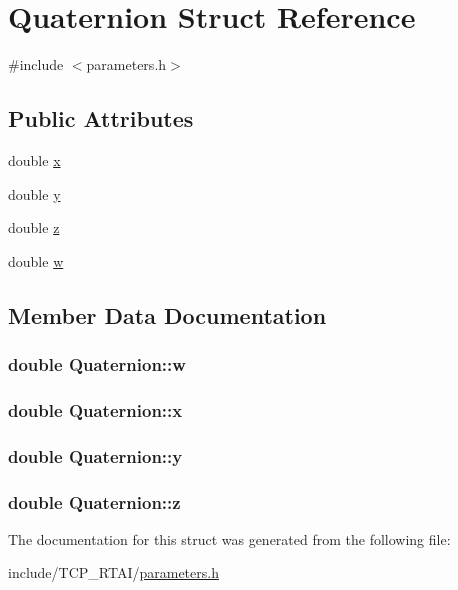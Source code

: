 \hypertarget{structQuaternion}{
\section{Quaternion Struct Reference}
\label{structQuaternion}
}


{\ttfamily \#include $<$parameters.h$>$}

\subsection*{Public Attributes}
\begin{DoxyCompactItemize}
\item 
double \hyperlink{structQuaternion_a65c93d8db6c57203447bd0594b608512}{x}
\item 
double \hyperlink{structQuaternion_acfea23e3ba2b57356fe36b4d8f4c52f3}{y}
\item 
double \hyperlink{structQuaternion_a90bbdb05526bddfbc3247dcc9a5cace4}{z}
\item 
double \hyperlink{structQuaternion_aeded08fcb4e8d0866e612ed81cb44aa7}{w}
\end{DoxyCompactItemize}


\subsection{Member Data Documentation}
\hypertarget{structQuaternion_aeded08fcb4e8d0866e612ed81cb44aa7}{
\subsubsection[{w}]{\setlength{\rightskip}{0pt plus 5cm}double {\bf Quaternion::w}}}
\label{structQuaternion_aeded08fcb4e8d0866e612ed81cb44aa7}
\hypertarget{structQuaternion_a65c93d8db6c57203447bd0594b608512}{
\subsubsection[{x}]{\setlength{\rightskip}{0pt plus 5cm}double {\bf Quaternion::x}}}
\label{structQuaternion_a65c93d8db6c57203447bd0594b608512}
\hypertarget{structQuaternion_acfea23e3ba2b57356fe36b4d8f4c52f3}{
\subsubsection[{y}]{\setlength{\rightskip}{0pt plus 5cm}double {\bf Quaternion::y}}}
\label{structQuaternion_acfea23e3ba2b57356fe36b4d8f4c52f3}
\hypertarget{structQuaternion_a90bbdb05526bddfbc3247dcc9a5cace4}{
\subsubsection[{z}]{\setlength{\rightskip}{0pt plus 5cm}double {\bf Quaternion::z}}}
\label{structQuaternion_a90bbdb05526bddfbc3247dcc9a5cace4}


The documentation for this struct was generated from the following file:\begin{DoxyCompactItemize}
\item 
include/TCP\_\-RTAI/\hyperlink{include_2TCP__RTAI_2parameters_8h}{parameters.h}\end{DoxyCompactItemize}
